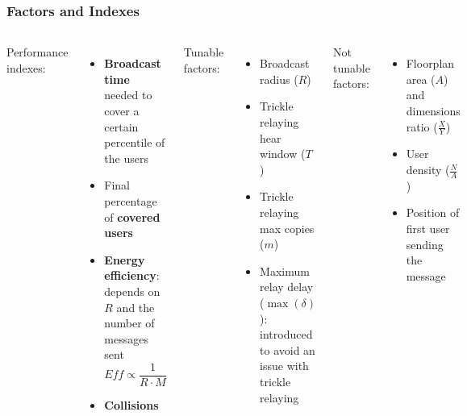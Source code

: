 \documentclass[aspectratio=169]{beamer}
\begin{document}
\begin{frame}
	\frametitle{Factors and Indexes}
	\begin{columns}
		Performance indexes:
		\begin{itemize}
			\item \textbf{Broadcast time} needed to cover a certain
				percentile of the users
			\item Final percentage of \textbf{covered users}
			\item \textbf{Energy efficiency}: depends on \(R\) and
				the number of messages sent
				\[\mathit{Eff} \propto \frac{1}{R \cdot M}\]
			\item \textbf{Collisions}
		\end{itemize}
		Tunable factors:
		\begin{itemize}
			\item Broadcast radius (\(R\))
			\item Trickle relaying hear window (\(T\))
			\item Trickle relaying max copies (\(m\))
			\item Maximum relay delay (\(\max(\delta)\)): introduced
				to avoid an issue with trickle relaying
		\end{itemize}
		Not tunable factors:
		\begin{itemize}
			\item Floorplan area (\(A\)) and dimensions ratio
				(\(\frac{X}{Y}\))
			\item User density (\(\frac{N}{A}\))
			\item Position of first user sending the message
		\end{itemize}
	\end{columns}
\end{frame}
\end{document}

